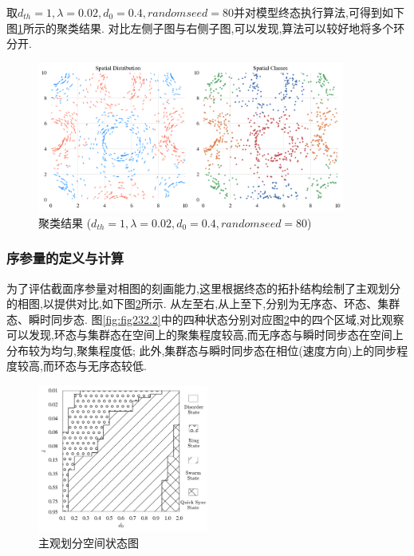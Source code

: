 \documentclass{article}
\begin{document}
取$d_{th}=1, \lambda=0.02, d_0=0.4, random seed=80$并对模型终态执行算法,可得到如下图\ref{fig:fig233.1}所示的聚类结果. 对比左侧子图与右侧子图,可以发现,算法可以较好地将多个环分开.

\begin{figure}[H]
	\centering
	\includegraphics[width=0.9\textwidth]{./figs/ClusteringResult.png}
	\vspace{-0.4cm}
	\caption{聚类结果 ($d_{th}=1, \lambda=0.02, d_0=0.4, random seed=80$)}
	\label{fig:fig233.1}
\end{figure}

\subsubsection{序参量的定义与计算}

为了评估截面序参量对相图的刻画能力,这里根据终态的拓扑结构绘制了主观划分的相图,以提供对比,如下图\ref{fig:fig234.1}所示. 从左至右,从上至下,分别为无序态、环态、集群态、瞬时同步态. 图\ref{fig:fig232.2}中的四种状态分别对应图\ref{fig:fig234.1}中的四个区域,对比观察可以发现,环态与集群态在空间上的聚集程度较高,而无序态与瞬时同步态在空间上分布较为均匀,聚集程度低; 此外,集群态与瞬时同步态在相位(速度方向)上的同步程度较高,而环态与无序态较低.

\begin{figure}[H]
	\centering
	\includegraphics[width=0.5\textwidth]{./figs/subjectiveOp3.png}
	\vspace{-0.5cm}
	\caption{主观划分空间状态图}
	\label{fig:fig234.1}
\end{figure}
\vspace{-0.5cm}
\end{document}
